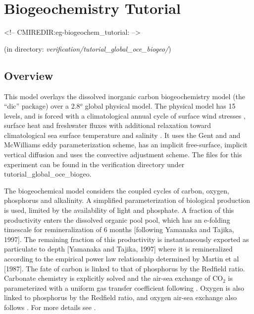 \section{Biogeochemistry Tutorial}
\label{sec:eg-biogeochem_tutorial}
\begin{rawhtml}
<!-- CMIREDIR:eg-biogeochem_tutorial: -->
\end{rawhtml}
\begin{center}
(in directory: {\it verification/tutorial\_global\_oce\_biogeo/})
\end{center}

\subsection{Overview}
This model overlays the dissolved inorganic carbon biogeochemistry
model (the ``dic'' package) over a 2.8$^o$ global physical model. The
physical model has 15 levels, and is forced with a climatological
annual cycle of surface wind stresses \cite{Trenberth_etal_89},
surface heat and freshwater fluxes \cite{jiang99} with additional
relaxation toward climatological sea surface temperature and salinity
\cite{lev:94a,Levitus94}.  It uses the Gent and and McWilliams
\cite{gen-mcw:90} eddy parameterization scheme, has an implicit
free-surface, implicit vertical diffusion and uses the convective
adjustment scheme. The files for this experiment can be found in
the verification directory under tutorial\_global\_oce\_biogeo.

The biogeochemical model considers the coupled cycles of carbon,
oxygen, phosphorus and alkalinity.  A simplified parameterization of
biological production is used, limited by the availability of light
and phosphate.  A fraction of this productivity enters the dissolved
organic pool pool, which has an e-folding timescale for
remineralization of 6 months [following Yamanaka and Tajika, 1997].
The remaining fraction of this productivity is instantaneously
exported as particulate to depth [Yamanaka and Tajika, 1997] where it
is remineralized according to the empirical power law relationship
determined by Martin et al [1987].  The fate of carbon is linked to
that of phosphorus by the Redfield ratio. Carbonate chemistry is
explicitly solved \cite{Follows_etal_05} and the air-sea exchange of
CO$_2$ is parameterized with a uniform gas transfer coefficient
following \cite{Wanninkhof_92}. Oxygen is also linked to phosphorus by
the Redfield ratio, and oxygen air-sea exchange also follows
\cite{Wanninkhof_92}.  For more details see \cite{Dutkiewicz_etal_05}.

